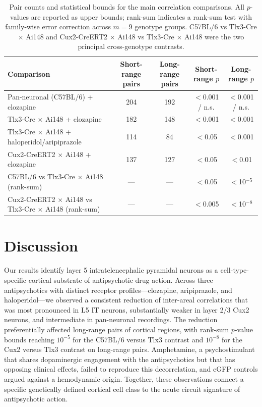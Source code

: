 \documentclass[11pt]{article}
\begin{document}
\begin{table}[htbp]
\centering
\caption{Pair counts and statistical bounds for the main correlation comparisons. All $p$-values are reported as upper bounds; rank-sum indicates a rank-sum test with family-wise error correction across $m=9$ genotype groups. C57BL/6 vs Tlx3-Cre $\times$ Ai148 and Cux2-CreERT2 $\times$ Ai148 vs Tlx3-Cre $\times$ Ai148 were the two principal cross-genotype contrasts.}
\label{tab:stats}
\begin{tabular}{lcccc}
\toprule
Comparison & Short-range pairs & Long-range pairs & Short-range $p$ & Long-range $p$ \\
\midrule
Pan-neuronal (C57BL/6) + clozapine & 204 & 192 & $<$0.001 / n.s. & $<$0.001 / n.s. \\
Tlx3-Cre $\times$ Ai148 + clozapine & 182 & 148 & $<$0.001 & $<$0.001 \\
Tlx3-Cre $\times$ Ai148 + haloperidol/aripiprazole & 114 & 84 & $<$0.05 & $<$0.001 \\
Cux2-CreERT2 $\times$ Ai148 + clozapine & 137 & 127 & $<$0.05 & $<$0.01 \\
\midrule
C57BL/6 vs Tlx3-Cre $\times$ Ai148 (rank-sum) & --- & --- & $<$0.05 & $<$10$^{-5}$ \\
Cux2-CreERT2 $\times$ Ai148 vs Tlx3-Cre $\times$ Ai148 (rank-sum) & --- & --- & $<$0.005 & $<$10$^{-8}$ \\
\bottomrule
\end{tabular}
\end{table}

\section{Discussion}

Our results identify layer 5 intratelencephalic pyramidal neurons as a cell-type-specific cortical substrate of antipsychotic drug action. Across three antipsychotics with distinct receptor profiles---clozapine, aripiprazole, and haloperidol---we observed a consistent reduction of inter-areal correlations that was most pronounced in L5 IT neurons, substantially weaker in layer 2/3 Cux2 neurons, and intermediate in pan-neuronal recordings. The reduction preferentially affected long-range pairs of cortical regions, with rank-sum $p$-value bounds reaching $10^{-5}$ for the C57BL/6 versus Tlx3 contrast and $10^{-8}$ for the Cux2 versus Tlx3 contrast on long-range pairs. Amphetamine, a psychostimulant that shares dopaminergic engagement with the antipsychotics but that has opposing clinical effects, failed to reproduce this decorrelation, and eGFP controls argued against a hemodynamic origin. Together, these observations connect a specific genetically defined cortical cell class to the acute circuit signature of antipsychotic action.
\end{document}
